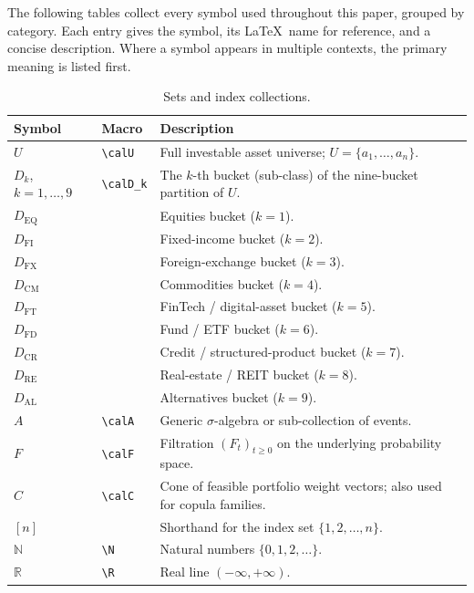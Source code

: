 \documentclass[12pt,openany]{book}
\newcommand{\R}{\mathbb{R}}
\newcommand{\N}{\mathbb{N}}
\newcommand{\calU}{\mathcal{U}}
\newcommand{\calA}{\mathcal{A}}
\newcommand{\calF}{\mathcal{F}}
\newcommand{\calD}{\mathcal{D}}
\newcommand{\calC}{\mathcal{C}}
\numberwithin{equation}{chapter}
\theoremstyle{plain}
\theoremstyle{definition}
\theoremstyle{remark}
\renewcommand{\arraystretch}{1.2}
\def\calU{U}%
\def\calD{D}%
\def\mathcal#1{#1}%
\def\calC{C}%
\def\calA{A}%
\def\calF{F}%
\begin{document}
The following tables collect every symbol used throughout this paper,
grouped by category.  Each entry gives the symbol, its \LaTeX\ name
for reference, and a concise description.  Where a symbol appears in
multiple contexts, the primary meaning is listed first.

\medskip

\begin{table}[H]
\renewcommand{\arraystretch}{1.35}
\caption{Sets and index collections.}
\label{tab:symbols-sets}
\begin{tabularx}{\linewidth}{@{} l l X @{}}
\toprule
\textbf{Symbol} & \textbf{Macro} & \textbf{Description} \\
\midrule
$\calU$ & \texttt{\textbackslash calU} &
  Full investable asset universe; $\calU=\{a_1,\ldots,a_n\}$. \\
$\calD_k$, $k=1,\ldots,9$ & \texttt{\textbackslash calD\_k} &
  The $k$-th bucket (sub-class) of the nine-bucket partition of $\calU$. \\
$\calD_{\mathrm{EQ}}$ & & Equities bucket ($k=1$). \\
$\calD_{\mathrm{FI}}$ & & Fixed-income bucket ($k=2$). \\
$\calD_{\mathrm{FX}}$ & & Foreign-exchange bucket ($k=3$). \\
$\calD_{\mathrm{CM}}$ & & Commodities bucket ($k=4$). \\
$\calD_{\mathrm{FT}}$ & & FinTech / digital-asset bucket ($k=5$). \\
$\calD_{\mathrm{FD}}$ & & Fund / ETF bucket ($k=6$). \\
$\calD_{\mathrm{CR}}$ & & Credit / structured-product bucket ($k=7$). \\
$\calD_{\mathrm{RE}}$ & & Real-estate / REIT bucket ($k=8$). \\
$\calD_{\mathrm{AL}}$ & & Alternatives bucket ($k=9$). \\
$\calA$ & \texttt{\textbackslash calA} &
  Generic $\sigma$-algebra or sub-collection of events. \\
$\calF$ & \texttt{\textbackslash calF} &
  Filtration $(\calF_t)_{t\geq0}$ on the underlying probability space. \\
$\calC$ & \texttt{\textbackslash calC} &
  Cone of feasible portfolio weight vectors; also used for copula families. \\
$[n]$ & & Shorthand for the index set $\{1,2,\ldots,n\}$. \\
$\N$ & \texttt{\textbackslash N} & Natural numbers $\{0,1,2,\ldots\}$. \\
$\R$ & \texttt{\textbackslash R} & Real line $(-\infty,+\infty)$. \\
\bottomrule
\end{tabularx}
\end{table}
\end{document}
